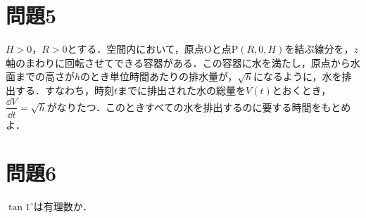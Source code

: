\documentclass[unicode,12pt, A4j]{ltjsarticle}%
\begin{document}
\section{問題5}
$H>0$，$R>0$とする．空間内において，原点$\mathrm{O}$と点$\mathrm{P}(R,0,H)$を結ぶ線分を，$z$軸のまわりに回転させてできる容器がある．この容器に水を満たし，原点から水面までの高さが$h$のとき単位時間あたりの排水量が，$\sqrt{h}$になるように，水を排出する．すなわち，時刻$t$までに排出された水の総量を$V(t)$とおくとき，$\dfrac{\dd V}{\dd t}=\sqrt{h}$がなりたつ．このときすべての水を排出するのに要する時間をもとめよ．

\section{問題6}
$\tan 1^\circ$は有理数か．
\end{document}
